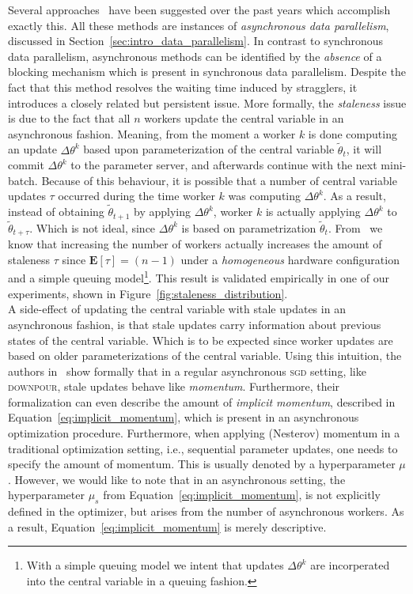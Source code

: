 Several approaches~\cite{dean2012large, ho2013more, cipar2013solving, recht2011hogwild, zhang2015deep, louppe2010zealous, jiang2017heterogeneity} have been suggested over the past years which accomplish exactly this. All these methods are instances of \emph{asynchronous data parallelism}, discussed in Section~\ref{sec:intro_data_parallelism}. In contrast to synchronous data parallelism, asynchronous methods can be identified by the \emph{absence} of a blocking mechanism which is present in synchronous data parallelism. Despite the fact that this method resolves the waiting time induced by stragglers, it introduces a closely related but persistent issue. More formally, the \emph{staleness} issue is due to the fact that all $n$ workers update the central variable in an asynchronous fashion. Meaning, from the moment a worker $k$ is done computing an update $\Delta\theta^k$ based upon parameterization of the central variable $\tilde{\theta}_{t}$, it will commit $\Delta\theta^k$ to the parameter server, and afterwards continue with the next mini-batch. Because of this behaviour, it is possible that a number of central variable updates $\tau$ occurred during the time worker $k$ was computing $\Delta\theta^k$. As a result, instead of obtaining $\tilde{\theta}_{t+1}$ by applying $\Delta\theta^k$, worker $k$ is actually applying $\Delta\theta^k$ to $\tilde{\theta}_{t+\tau}$. Which is not ideal, since $\Delta\theta^k$ is based on parametrization $\tilde{\theta}_t$. From~\cite{implicitmomentum} we know that increasing the number of workers actually increases the amount of staleness $\tau$ since $\mathbf{E}[\tau] = (n - 1)$ under a \emph{homogeneous} hardware configuration and a simple queuing model\footnote{With a simple queuing model we intent that updates $\Delta\theta^k$ are incorperated into the central variable in a queuing fashion.}. This result is validated empirically in one of our experiments, shown in Figure~\ref{fig:staleness_distribution}.\\

A side-effect of updating the central variable with stale updates in an asynchronous fashion, is that stale updates carry information about previous states of the central variable. Which is to be expected since worker updates are based on older parameterizations of the central variable. Using this intuition, the authors in~\cite{implicitmomentum} show formally that in a regular asynchronous \textsc{sgd} setting, like \textsc{downpour}, stale updates behave like \emph{momentum}. Furthermore, their formalization can even describe the amount of \emph{implicit momentum}, described in Equation~\ref{eq:implicit_momentum}, which is present in an asynchronous optimization procedure. Furthermore, when applying (Nesterov) momentum in a traditional optimization setting, i.e., sequential parameter updates, one needs to specify the amount of momentum. This is usually denoted by a hyperparameter $\mu$. However, we would like to note that in an asynchronous setting, the hyperparameter $\mu_s$ from Equation~\ref{eq:implicit_momentum}, is not explicitly defined in the optimizer, but arises from the number of asynchronous workers. As a result, Equation~\ref{eq:implicit_momentum} is merely descriptive.

